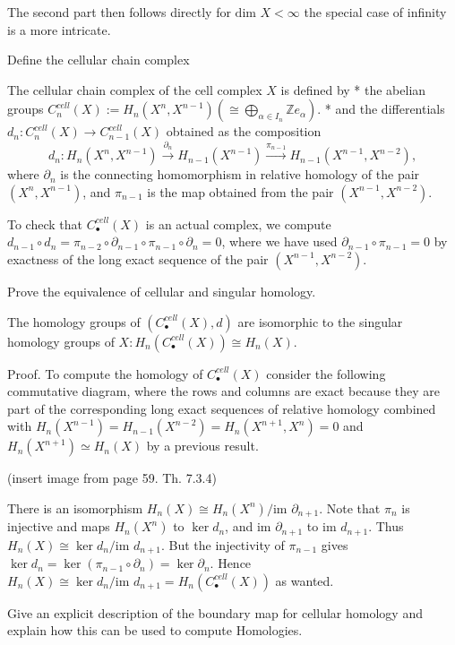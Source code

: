 The second part then follows directly for \( \text{dim }X < \infty \) the special case of infinity is a more intricate. 


Define the cellular chain complex

The cellular chain complex of the cell complex \(X\) is defined by 
* the abelian groups \(C^{cell}_n(X) := H_n(X^n, X^{n-1}) (\cong \bigoplus_{\alpha \in I_n} \mathbb{Z} e_\alpha)\).
* and the differentials \(d_n \colon C^{cell}_n(X) \to C^{cell}_{n-1}(X)\) obtained as the composition
\[ d_n \colon H_n(X^n, X^{n-1}) \xrightarrow{\partial_n} H_{n-1}(X^{n-1}) \xrightarrow{\pi_{n-1}} H_{n-1}(X^{n-1}, X^{n-2}), \]
where \(\partial_n\) is the connecting homomorphism in relative homology of the pair \((X^n, X^{n-1})\), and \(\pi_{n-1}\) 
is the map obtained from the pair \((X^{n-1}, X^{n-2})\).

To check that \(C^{cell}_\bullet(X)\) is an actual complex, we compute \(d_{n-1} \circ d_n = \pi_{n-2} \circ \partial_{n-1} \circ \pi_{n-1} \circ \partial_n = 0\), 
where we have used \(\partial_{n-1} \circ \pi_{n-1} = 0\) by exactness of the long exact sequence of the pair \((X^{n-1}, X^{n-2})\). 


Prove the equivalence of cellular and singular homology.

The homology groups of \((C^{cell}_\bullet(X), d)\) are isomorphic to the singular homology groups of \(X: H_n(C^{cell}_\bullet(X)) \cong H_n(X)\).

Proof. 
To compute the homology of \(C^{cell}_\bullet(X)\) consider the following commutative diagram, where the rows and columns are exact 
because they are part of the corresponding long exact sequences of relative homology combined with \( H_n(X^{n-1}) = H_{n-1}(X^{n-2}) = H_n(X^{n+1}, X^n) = 0 \)
and \( H_n(X^{n+1}) \simeq H_n(X) \) by a previous result.

(insert image from page 59. Th. 7.3.4)

There is an isomorphism \(H_n(X) \cong H_n(X^n) / \text{im } \partial_{n+1}\). 
Note that \(\pi_n\) is injective and maps \(H_n(X^n)\) to \(\ker d_n\), and \(\text{im } \partial_{n+1}\) to \(\text{im } d_{n+1}\). 
Thus \(H_n(X) \cong \ker d_n / \text{im } d_{n+1}\). But the injectivity of \(\pi_{n-1}\) gives \(\ker d_n = \ker (\pi_{n-1} \circ \partial_n) = \ker \partial_n\). 
Hence \(H_n(X) \cong \ker d_n / \text{im } d_{n+1} = H_n(C^{cell}_\bullet (X))\) as wanted.


Give an explicit description of the boundary map for cellular homology and explain how 
this can be used to compute Homologies.

